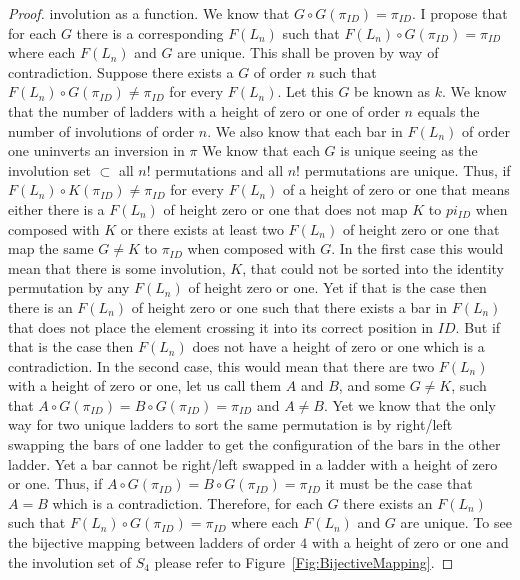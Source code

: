\begin{proof}
    involution as a function. We know that $G \circ G(\pi_{ID})=\pi_{ID}$. I propose that for each $G$ there is a corresponding $F(L_{n})$
    such that $F(L_{n}) \circ G(\pi_{ID}) = \pi_{ID}$ where each $F(L_{n})$ and $G$ are unique. 
    This shall be proven by way of contradiction. Suppose there exists a $G$ of order $n$ such that  $F(L_{n}) \circ G(\pi_{ID}) \neq \pi_{ID}$ 
    for every $F(L_{n})$.
    Let this $G$ be known as $k$. 
    We know that the number of ladders with a height of zero or one of order $n$ equals the number of involutions of order $n$. 
    We also know that each bar in $F(L_{n})$ of order one uninverts an inversion in $\pi$ 
    We know that each $G$ is unique seeing as the involution set $\subset$ all $n!$ permutations and all 
    $n!$ permutations are unique. Thus, if $F(L_{n}) \circ K(\pi_{ID}) \neq \pi_{ID}$ for every $F(L_{n})$ 
    of a height of zero or one that means either there is a 
    $F(L_{n})$ of height zero or one that does not map $K$ to $pi_{ID}$ when composed with $K$ or there exists at least two $F(L_{n})$ 
    of height zero or one that map the 
    same $G \neq K$ to $\pi_{ID}$ when composed with $G$. 
    In the first case this would mean that there is some involution, $K$, that could not be sorted into the identity 
    permutation by any $F(L_{n})$ of height zero or one. Yet if that is the case then there is an $F(L_{n})$ 
    of height zero or one such that there exists 
    a bar in $F(L_{n})$ that does not place the element crossing it into its correct position in $ID$. 
    But if that is the case then $F(L_{n})$ does not 
    have a height of zero or one which is a contradiction. 
    In the second case, this would mean that there are two $F(L_{n})$ with a height of zero or one, 
    let us call them $A$ and $B$, and some $G\neq K$, such that $A\circ G(\pi_{ID}) = B\circ G(\pi_{ID})=\pi_{ID}$ and $A \neq B$. 
    Yet we know that the only way for two unique ladders 
    to sort the same permutation is by right/left swapping the bars of one ladder to get the configuration of the bars in the other ladder. 
    Yet a bar cannot be 
    right/left swapped in a ladder with a height of zero or one. Thus, if 
    $A\circ G(\pi_{ID}) = B\circ G(\pi_{ID})=\pi_{ID}$ it must be the case that $A=B$ which is a contradiction. Therefore, 
    for each $G$ there exists an $F(L_{n})$ such that 
     $F(L_{n}) \circ G(\pi_{ID}) = \pi_{ID}$ where each $F(L_{n})$ and $G$ are unique. 
     To see the bijective mapping 
     between ladders of order $4$ with a height of zero or one and the involution set of $S_{4}$ please refer to Figure~\ref{Fig:BijectiveMapping}.
\end{proof}\pagebreak
